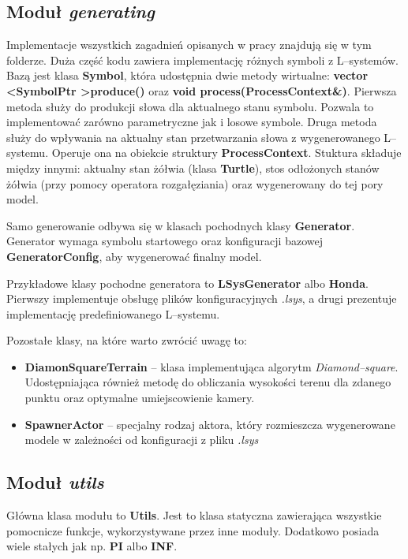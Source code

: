 \documentclass[inz,longabstract]{iithesis}
\begin{document}
        \subsection{Moduł \textit{generating}}
            Implementacje wszystkich zagadnień opisanych w pracy znajdują się w tym folderze. Duża część kodu zawiera implementację różnych symboli z L--systemów. Bazą jest klasa \textbf{Symbol}, która udostępnia dwie metody wirtualne: \textbf{vector \textless SymbolPtr \textgreater produce()} oraz \textbf{void process(ProcessContext\&)}. Pierwsza metoda służy do produkcji słowa dla aktualnego stanu symbolu. Pozwala to implementować zarówno parametryczne jak i losowe symbole. Druga metoda służy do wpływania na aktualny stan przetwarzania słowa z wygenerowanego L--systemu. Operuje ona na obiekcie struktury \textbf{ProcessContext}. Stuktura składuje między innymi: aktualny stan żółwia (klasa \textbf{Turtle}), stos odłożonych stanów żółwia (przy pomocy operatora rozgałęziania) oraz wygenerowany do tej pory model.
            
            Samo generowanie odbywa się w klasach pochodnych klasy \textbf{Generator}. Generator wymaga symbolu startowego oraz konfiguracji bazowej \textbf{GeneratorConfig}, aby wygenerować finalny model.
            
            Przykładowe klasy pochodne generatora to \textbf{LSysGenerator} albo \textbf{Honda}. Pierwszy implementuje obsługę plików konfiguracyjnych \textit{.lsys}, a drugi prezentuje implementację predefiniowanego L--systemu.
            
            Pozostałe klasy, na które warto zwrócić uwagę to:
            \begin{itemize}
                \item \textbf{DiamonSquareTerrain} -- klasa implementująca algorytm \textit{Diamond--square}. Udostępniająca również metodę do obliczania wysokości terenu dla zdanego punktu oraz optymalne umiejscowienie kamery.
                \item \textbf{SpawnerActor} -- specjalny rodzaj aktora, który rozmieszcza wygenerowane modele w zależności od konfiguracji z pliku \textit{.lsys} 
            \end{itemize}
            
        \subsection{Moduł \textit{utils}}
            Główna klasa modułu to \textbf{Utils}. Jest to klasa statyczna zawierająca wszystkie pomocnicze funkcje, wykorzystywane przez inne moduły. Dodatkowo posiada wiele stałych jak np. \textbf{PI} albo \textbf{INF}.
            
\end{document}
